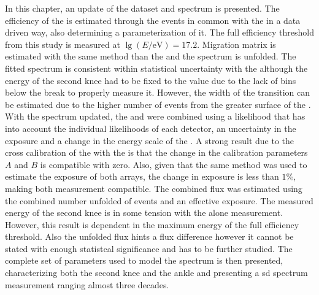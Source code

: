 \documentclass[main.tex]{subfiles}
\begin{document}
In this chapter, an update of the  dataset and spectrum is presented.
The efficiency of the  is estimated through the events in common with the  in a data driven way, also determining a parameterization of it.
The full efficiency threshold from this study is measured at $\lg(E/\mathrm{eV})=17.2$.
Migration matrix is estimated with the same method than the  and the spectrum is unfolded.
The fitted spectrum is consistent within statistical uncertainty with the  although the energy of the second knee had to be fixed to the  value due to the lack of bins below the break to properly measure it.
However, the width of the transition can be estimated due to the higher number of events from the greater surface of the .
With the spectrum updated, the  and  were combined using a likelihood that has into account the individual likelihoods of each detector, an uncertainty in the exposure and a change in the energy scale of the .
A strong result due to the cross calibration of the  with the  is that the change in the calibration parameters $A$ and $B$ is compatible with zero.
Also, given that the same method was used to estimate the exposure of both arrays, the change in exposure is less than $1\%$, making both measurement compatible.
The combined flux was estimated using the combined number unfolded of events and an effective exposure.
The measured energy of the second knee is in some tension with the  alone measurement.
However, this result is dependent in the maximum energy of the  full efficiency threshold.
Also the unfolded flux hints a flux difference however it cannot be stated with enough statistcal significance and has to be further studied.
The complete set of parameters used to model the spectrum is then presented, characterizing both the second knee and the ankle and presenting a \gls{sd} spectrum measurement ranging almost three decades.

\end{document}
